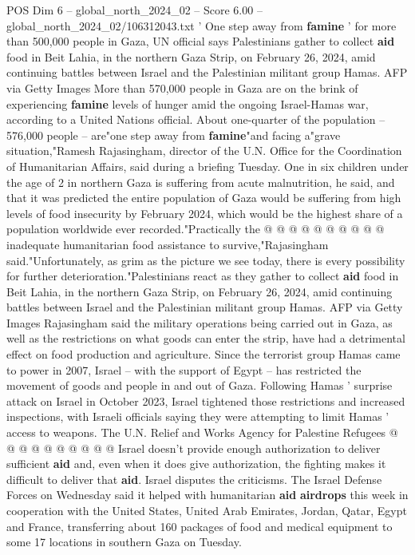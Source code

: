 \begin{textsample}{POS Dim 6 – global\_north\_2024\_02 – Score 6.00 – global\_north\_2024\_02/106312043.txt}  \label{ex:f6_pos_199}
' One step away from \textbf{famine} ' for more than 500,000 people in Gaza, UN official says Palestinians gather to collect \textbf{aid} food in Beit Lahia, in the northern Gaza Strip, on February 26, 2024, amid continuing battles between Israel and the Palestinian militant group Hamas.
AFP via Getty Images More than 570,000 people in Gaza are on the brink of experiencing \textbf{famine} levels of hunger amid the ongoing Israel-Hamas war, according to a United Nations official.
About one-quarter of the population -- 576,000 people -- are"one step away from \textbf{famine}"and facing a"grave situation,"Ramesh Rajasingham, director of the U.N.
Office for the Coordination of Humanitarian Affairs, said during a briefing Tuesday.
One in six children under the age of 2 in northern Gaza is suffering from acute malnutrition, he said, and that it was predicted the entire population of Gaza would be suffering from high levels of food insecurity by February 2024, which would be the highest share of a population worldwide ever recorded."Practically the @ @ @ @ @ @ @ @ @ @ inadequate humanitarian food assistance to survive,"Rajasingham said."Unfortunately, as grim as the picture we see today, there is every possibility for further deterioration."Palestinians react as they gather to collect \textbf{aid} food in Beit Lahia, in the northern Gaza Strip, on February 26, 2024, amid continuing battles between Israel and the Palestinian militant group Hamas.
AFP via Getty Images Rajasingham said the military operations being carried out in Gaza, as well as the restrictions on what goods can enter the strip, have had a detrimental effect on food production and agriculture.
Since the terrorist group Hamas came to power in 2007, Israel -- with the support of Egypt -- has restricted the movement of goods and people in and out of Gaza.
Following Hamas ' surprise attack on Israel in October 2023, Israel tightened those restrictions and increased inspections, with Israeli officials saying they were attempting to limit Hamas ' access to weapons.
The U.N.
Relief and Works Agency for Palestine Refugees @ @ @ @ @ @ @ @ @ @ Israel doesn't provide enough authorization to deliver sufficient \textbf{aid} and, even when it does give authorization, the fighting makes it difficult to deliver that \textbf{aid}.
Israel disputes the criticisms.
The Israel Defense Forces on Wednesday said it helped with humanitarian \textbf{aid} \textbf{airdrops} this week in cooperation with the United States, United Arab Emirates, Jordan, Qatar, Egypt and France, transferring about 160 packages of food and medical equipment to some 17 locations in southern Gaza on Tuesday.

\end{textsample}
